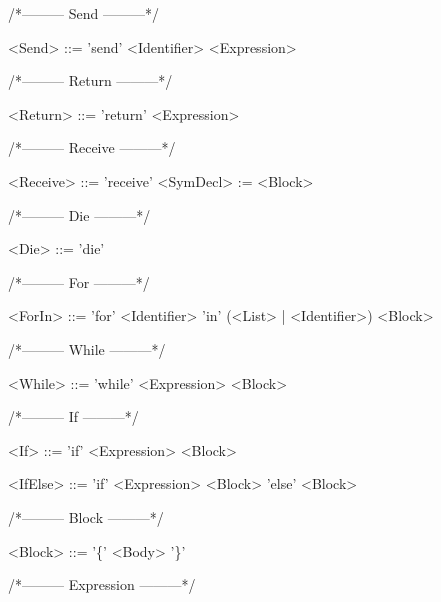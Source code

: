 /*--------- Send ---------*/
\begin{grammar}
<Send> ::= 'send' <Identifier> <Expression>

\end{grammar}
/*--------- Return ---------*/
\begin{grammar}
<Return> ::= 'return' <Expression>

\end{grammar}
/*--------- Receive ---------*/
\begin{grammar}
<Receive> ::= 'receive' <SymDecl> := <Block>

\end{grammar}
/*--------- Die ---------*/
\begin{grammar}
<Die> ::= 'die'

\end{grammar}
/*--------- For ---------*/
\begin{grammar}
<ForIn> ::= 'for' <Identifier> 'in' (<List> | <Identifier>) <Block>

\end{grammar}
/*--------- While ---------*/
\begin{grammar}
<While> ::= 'while' <Expression> <Block>

\end{grammar}
/*--------- If ---------*/
\begin{grammar}
<If> ::= 'if' <Expression> <Block>

<IfElse> ::= 'if' <Expression> <Block> 'else' <Block>

\end{grammar}
/*--------- Block ---------*/
\begin{grammar}
<Block> ::= '\{' <Body> '\}'

\end{grammar}
/*--------- Expression ---------*/
